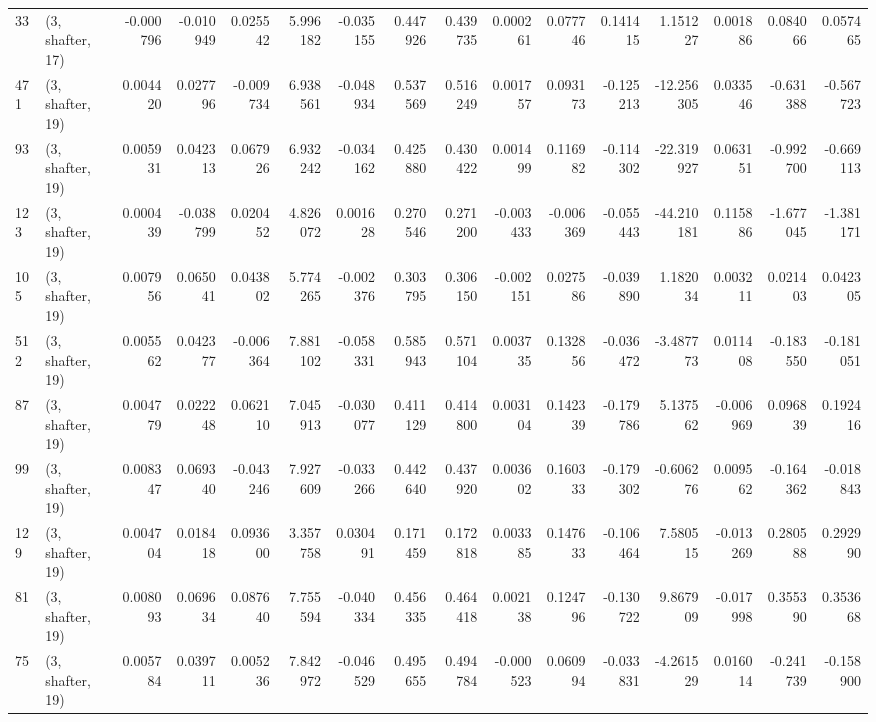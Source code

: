 \begin{tabular}{llrrrrrrrrrrrrrr}
33  &  (3, shafter, 17) &  -0.000796 & -0.010949 &  0.025542 &    5.996182 & -0.035155 &   0.447926 &  0.439735 &  0.000261 &  0.077746 &  0.141415 &    1.151227 &  0.001886 &  0.084066 &  0.057465 \\
471 &  (3, shafter, 19) &   0.004420 &  0.027796 & -0.009734 &    6.938561 & -0.048934 &   0.537569 &  0.516249 &  0.001757 &  0.093173 & -0.125213 &  -12.256305 &  0.033546 & -0.631388 & -0.567723 \\
93  &  (3, shafter, 19) &   0.005931 &  0.042313 &  0.067926 &    6.932242 & -0.034162 &   0.425880 &  0.430422 &  0.001499 &  0.116982 & -0.114302 &  -22.319927 &  0.063151 & -0.992700 & -0.669113 \\
123 &  (3, shafter, 19) &   0.000439 & -0.038799 &  0.020452 &    4.826072 &  0.001628 &   0.270546 &  0.271200 & -0.003433 & -0.006369 & -0.055443 &  -44.210181 &  0.115886 & -1.677045 & -1.381171 \\
105 &  (3, shafter, 19) &   0.007956 &  0.065041 &  0.043802 &    5.774265 & -0.002376 &   0.303795 &  0.306150 & -0.002151 &  0.027586 & -0.039890 &    1.182034 &  0.003211 &  0.021403 &  0.042305 \\
512 &  (3, shafter, 19) &   0.005562 &  0.042377 & -0.006364 &    7.881102 & -0.058331 &   0.585943 &  0.571104 &  0.003735 &  0.132856 & -0.036472 &   -3.487773 &  0.011408 & -0.183550 & -0.181051 \\
87  &  (3, shafter, 19) &   0.004779 &  0.022248 &  0.062110 &    7.045913 & -0.030077 &   0.411129 &  0.414800 &  0.003104 &  0.142339 & -0.179786 &    5.137562 & -0.006969 &  0.096839 &  0.192416 \\
99  &  (3, shafter, 19) &   0.008347 &  0.069340 & -0.043246 &    7.927609 & -0.033266 &   0.442640 &  0.437920 &  0.003602 &  0.160333 & -0.179302 &   -0.606276 &  0.009562 & -0.164362 & -0.018843 \\
129 &  (3, shafter, 19) &   0.004704 &  0.018418 &  0.093600 &    3.357758 &  0.030491 &   0.171459 &  0.172818 &  0.003385 &  0.147633 & -0.106464 &    7.580515 & -0.013269 &  0.280588 &  0.292990 \\
81  &  (3, shafter, 19) &   0.008093 &  0.069634 &  0.087640 &    7.755594 & -0.040334 &   0.456335 &  0.464418 &  0.002138 &  0.124796 & -0.130722 &    9.867909 & -0.017998 &  0.355390 &  0.353668 \\
75  &  (3, shafter, 19) &   0.005784 &  0.039711 &  0.005236 &    7.842972 & -0.046529 &   0.495655 &  0.494784 & -0.000523 &  0.060994 & -0.033831 &   -4.261529 &  0.016014 & -0.241739 & -0.158900 \\

\end{tabular}
